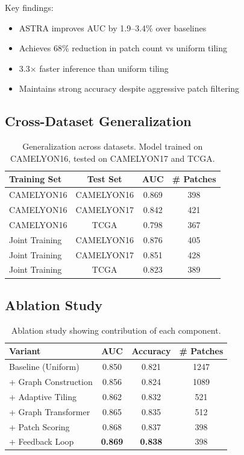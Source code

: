 \documentclass[runningheads]{llncs}
\begin{document}
Key findings:
\begin{itemize}
\item ASTRA improves AUC by 1.9--3.4\% over baselines
\item Achieves 68\% reduction in patch count vs uniform tiling
\item 3.3$\times$ faster inference than uniform tiling
\item Maintains strong accuracy despite aggressive patch filtering
\end{itemize}

\subsection{Cross-Dataset Generalization}

\begin{table}[h]
\centering
\caption{Generalization across datasets. Model trained on CAMELYON16, tested on CAMELYON17 and TCGA.}
\label{tab:generalization}
\begin{tabular}{lccc}
\toprule
\textbf{Training Set} & \textbf{Test Set} & \textbf{AUC} & \textbf{\# Patches} \\
\midrule
CAMELYON16 & CAMELYON16 & 0.869 & 398 \\
CAMELYON16 & CAMELYON17 & 0.842 & 421 \\
CAMELYON16 & TCGA & 0.798 & 367 \\
\midrule
Joint Training & CAMELYON16 & 0.876 & 405 \\
Joint Training & CAMELYON17 & 0.851 & 428 \\
Joint Training & TCGA & 0.823 & 389 \\
\bottomrule
\end{tabular}
\end{table}

\subsection{Ablation Study}

\label{sec:ablation}

\begin{table}[h]
\centering
\caption{Ablation study showing contribution of each component.}
\label{tab:ablation}
\begin{tabular}{lccc}
\toprule
\textbf{Variant} & \textbf{AUC} & \textbf{Accuracy} & \textbf{\# Patches} \\
\midrule
Baseline (Uniform) & 0.850 & 0.821 & 1247 \\
+ Graph Construction & 0.856 & 0.824 & 1089 \\
+ Adaptive Tiling & 0.862 & 0.832 & 521 \\
+ Graph Transformer & 0.865 & 0.835 & 512 \\
+ Patch Scoring & 0.868 & 0.837 & 398 \\
+ Feedback Loop & \textbf{0.869} & \textbf{0.838} & 398 \\
\bottomrule
\end{tabular}
\end{table}
\end{document}
